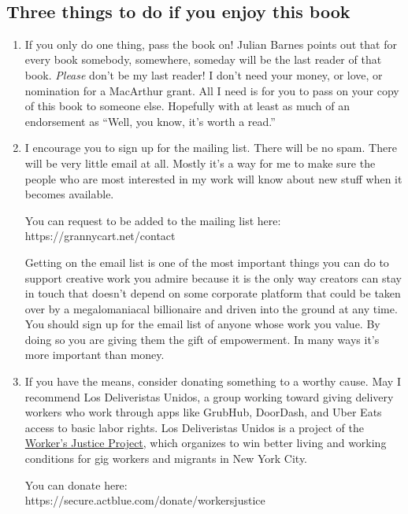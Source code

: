 \documentclass[
]{scrbook}
\begin{document}
\newpage

\ %

\newpage


\thispagestyle{empty}

\small

\hypertarget{three-things-to-do-if-you-enjoy-this-book}{%
\subsection{Three things to do if you enjoy this
book}\label{three-things-to-do-if-you-enjoy-this-book}}

\begin{enumerate}
\def\labelenumi{\arabic{enumi}.}
\item If you only do one thing, pass the book on! Julian Barnes points out that for every book somebody, somewhere, someday will be the last reader of that book. \emph{Please} don't be my last reader! I don't need your money, or love, or nomination for a MacArthur grant. All I need is for you to pass on your copy of this book to someone else.  Hopefully with at least as much of an endorsement as ``Well, you know, it's worth a read.''
\item I encourage you to sign up for the mailing list. There will be no spam. There will be very little email at all. Mostly it's a way for me to make sure the people who are most interested in my work will know about new stuff when it becomes available.
	
  You can request to be added to the mailing list here:\\
  https://grannycart.net/contact

  Getting on the email list is one of the most important things you can do to support creative work you admire because it is the only way creators can stay in touch that doesn't depend on some corporate platform that could be taken over by a megalomaniacal billionaire and driven into the ground at any time. You should sign up for the email list of anyone whose work you value. By doing so you are giving them the gift of empowerment. In many ways it's more important than money.
\item If you have the means, consider donating something to a worthy cause.  May I recommend Los Deliveristas Unidos, a group working toward giving delivery workers who work through apps like GrubHub, DoorDash, and Uber Eats access to basic labor rights. Los Deliveristas Unidos is a project of the \href{http://www.workersjustice.org/workers-justice-project}{Worker's Justice Project}, which organizes to win better living and working conditions for gig workers and migrants in New York City.

  You can donate here:\\
  https://secure.actblue.com/donate/workersjustice
\end{enumerate}

\backmatter
\end{document}
